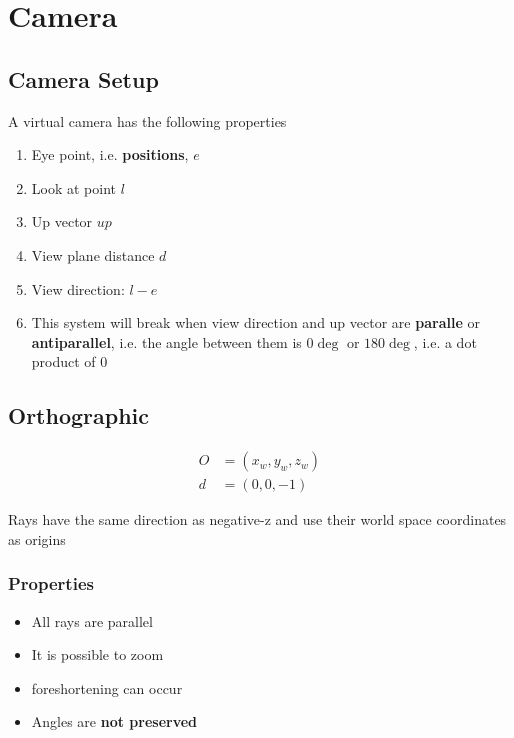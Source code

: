 \chapter{Camera}

\section{Camera Setup}

  A virtual camera has the following properties

  \begin{enumerate}
    \item Eye point, i.e. \textbf{positions}, $ e $
    \item Look at point $ l $
    \item Up vector $ up $
    \item View plane distance $ d $
    \item View direction: $ l - e $
    \item This system will break when view direction and up vector are
    \textbf{paralle} or \textbf{antiparallel}, i.e. the angle between them is
    $ 0\deg $ or $ 180\deg $, i.e. a dot product of $ 0 $
  \end{enumerate}

\section{Orthographic}

  \begin{align}
    O &= \left( x_{w}, y_{w}, z_{w} \right) \\
    d &= \left( 0, 0, -1 \right)
  \end{align}

  Rays have the same direction as negative-z and use their world space
  coordinates as origins

  \subsection{Properties}

    \begin{itemize}
      \item All rays are parallel
      \item It is possible to zoom
      \item \Gls{foreshortening} can occur
      \item Angles are \textbf{not preserved}
    \end{itemize}

